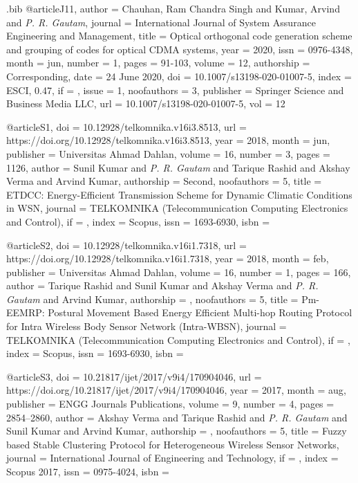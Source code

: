 \begin{filecontents}{\jobname .bib}
@article{J11,
  author      = {Chauhan, Ram Chandra Singh and Kumar, Arvind and \emph{P. R. Gautam}},
  journal     = {International Journal of System Assurance Engineering and Management},
  title       = {Optical orthogonal code generation scheme and grouping of codes for optical {CDMA} systems},
  year        = {2020},
  issn        = {0976-4348},
  month       = {jun},
  number      = {1},
  pages       = {91-103},
  volume      = {12},
  authorship  = {Corresponding},
  date        = {24 June 2020},
  doi         = {10.1007/s13198-020-01007-5},
  index       = {ESCI, 0.47},
  if          = {},
  issue       = {1},
  noofauthors = {3},
  publisher   = {Springer Science and Business Media {LLC}},
  url         = {10.1007/s13198-020-01007-5},
  vol         = {12}
}



@article{S1,
  doi         = {10.12928/telkomnika.v16i3.8513},
  url         = {https://doi.org/10.12928/telkomnika.v16i3.8513},
  year        = 2018,
  month       = {jun},
  publisher   = {Universitas Ahmad Dahlan},
  volume      = {16},
  number      = {3},
  pages       = {1126},
  author      = {Sunil Kumar and \emph{P. R. Gautam} and Tarique Rashid and Akshay Verma and Arvind Kumar},
  authorship  = {Second},
  noofauthors = {5},
  title       = {{ETDCC}: Energy-Efficient Transmission Scheme for Dynamic Climatic Conditions in {WSN}},
  journal     = {{TELKOMNIKA} (Telecommunication Computing Electronics and Control)},
  if          = {},
  index       = {Scopus},
  issn        = {1693-6930},
  isbn        = {}
}

@article{S2,
  doi         = {10.12928/telkomnika.v16i1.7318},
  url         = {https://doi.org/10.12928/telkomnika.v16i1.7318},
  year        = {2018},
  month       = {feb},
  publisher   = {Universitas Ahmad Dahlan},
  volume      = {16},
  number      = {1},
  pages       = {166},
  author      = {Tarique Rashid and Sunil Kumar and Akshay Verma and \emph{P. R. Gautam} and Arvind Kumar},
  authorship  = {},
  noofauthors = {5},
  title       = {Pm-{EEMRP}: Postural Movement Based Energy Efficient Multi-hop Routing Protocol for Intra Wireless Body Sensor Network (Intra-{WBSN})},
  journal     = {{TELKOMNIKA} (Telecommunication Computing Electronics and Control)},
  if          = {},
  index       = {Scopus},
  issn        = {1693-6930},
  isbn        = {}
}

@article{S3,
  doi         = {10.21817/ijet/2017/v9i4/170904046},
  url         = {https://doi.org/10.21817/ijet/2017/v9i4/170904046},
  year        = 2017,
  month       = {aug},
  publisher   = {{ENGG} Journals Publications},
  volume      = {9},
  number      = {4},
  pages       = {2854--2860},
  author      = {Akshay Verma and Tarique Rashid and \emph{P. R. Gautam} and Sunil Kumar and Arvind Kumar},
  authorship  = {},
  noofauthors = {5},
  title       = {Fuzzy based Stable Clustering Protocol {for Heterogeneous} Wireless Sensor Networks},
  journal     = {International Journal of Engineering and Technology},
  if          = {},
  index       = {Scopus 2017},
  issn        = {0975-4024},
  isbn        = {}
}


\end{filecontents}
